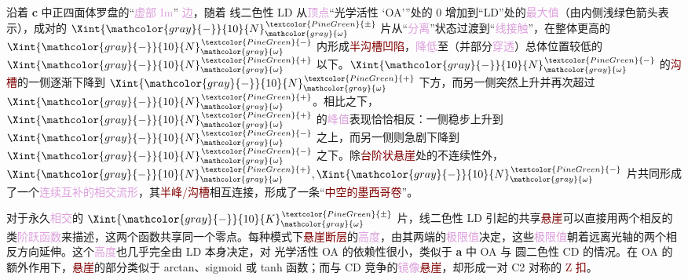 沿着 \textbf{c} 中\textcolor{NavyBlue}{正四面体罗盘}的“\textcolor{Plum}{虚部 Im}” \textcolor{Plum}{边}，随着 \textcolor{NavyBlue}{线二色性 LD} 从\textcolor{Plum}{顶点}“\textcolor{NavyBlue}{光学活性 `OA'}”处的 0 增加到“\textcolor{NavyBlue}{LD}”处的\textcolor{Plum}{最大值}（由内侧浅绿色箭头表示），成对的 $\Xint{\mathcolor{gray}{-}}{10}{N}^{\;\!\textcolor{PineGreen}{\pm}}_{\mathcolor{gray}{\omega}}$ 片从“\textcolor{Plum}{分离}”状态过渡到“\textcolor{Plum}{线接触}”，在整体更高的 $\Xint{\mathcolor{gray}{-}}{10}{N}^{\;\!\textcolor{PineGreen}{-}}_{\mathcolor{gray}{\omega}}$ 内形成\textcolor{Maroon}{半沟槽凹陷}，\textcolor{Plum}{降低}至（并部分\textcolor{Plum}{穿透}）总体位置较低的 $\Xint{\mathcolor{gray}{-}}{10}{N}^{\;\!\textcolor{PineGreen}{+}}_{\mathcolor{gray}{\omega}}$ 以下。$\Xint{\mathcolor{gray}{-}}{10}{N}^{\;\!\textcolor{PineGreen}{-}}_{\mathcolor{gray}{\omega}}$ 的\textcolor{Maroon}{沟槽}的一侧逐渐下降到 $\Xint{\mathcolor{gray}{-}}{10}{N}^{\;\!\textcolor{PineGreen}{+}}_{\mathcolor{gray}{\omega}}$ 下方，而另一侧突然上升并再次超过 $\Xint{\mathcolor{gray}{-}}{10}{N}^{\;\!\textcolor{PineGreen}{+}}_{\mathcolor{gray}{\omega}}$。相比之下，$\Xint{\mathcolor{gray}{-}}{10}{N}^{\;\!\textcolor{PineGreen}{+}}_{\mathcolor{gray}{\omega}}$ 的\textcolor{Plum}{峰值}表现恰恰相反：一侧稳步上升到 $\Xint{\mathcolor{gray}{-}}{10}{N}^{\;\!\textcolor{PineGreen}{-}}_{\mathcolor{gray}{\omega}}$ 之上，而另一侧则急剧下降到 $\Xint{\mathcolor{gray}{-}}{10}{N}^{\;\!\textcolor{PineGreen}{-}}_{\mathcolor{gray}{\omega}}$ 之下。除\textcolor{Maroon}{台阶状悬崖}处的不连续性外，$\Xint{\mathcolor{gray}{-}}{10}{N}^{\;\!\textcolor{PineGreen}{+}}_{\mathcolor{gray}{\omega}}, \Xint{\mathcolor{gray}{-}}{10}{N}^{\;\!\textcolor{PineGreen}{-}}_{\mathcolor{gray}{\omega}}$ 片共同形成了一个\textcolor{Plum}{连续互补的相交流形}，其\textcolor{Maroon}{半峰/沟槽}相互连接，形成了一条“\textcolor{Maroon}{中空的墨西哥卷}”。

对于永久\textcolor{Plum}{相交}的 $\Xint{\mathcolor{gray}{-}}{10}{K}^{\;\!\textcolor{PineGreen}{\pm}}_{\mathcolor{gray}{\omega}}$ 片，\textcolor{NavyBlue}{线二色性 LD} 引起的共享\textcolor{Maroon}{悬崖}可以直接用两个相反的类\textcolor{Plum}{阶跃函数}来描述，这两个函数共享同一个零点。每种\textcolor{PineGreen}{模式}下\textcolor{Maroon}{悬崖断层}的\textcolor{Plum}{高度}，由其两端的\textcolor{Plum}{极限值}决定，这些\textcolor{Plum}{极限值}朝着远离\textcolor{PineGreen}{光轴}的两个相反方向延伸。这个\textcolor{Plum}{高度}也几乎完全由 \textcolor{NavyBlue}{LD} 本身决定，对 \textcolor{NavyBlue}{光学活性 OA} 的依赖性很小，类似于 \textbf{a} 中 \textcolor{NavyBlue}{OA} 与 \textcolor{NavyBlue}{圆二色性 CD} 的情况。在 \textcolor{NavyBlue}{OA} 的额外作用下，\textcolor{Maroon}{悬崖}的部分类似于 arctan、sigmoid 或 tanh 函数；而与 \textcolor{NavyBlue}{CD} 竞争的\textcolor{Plum}{镜像}\textcolor{Maroon}{悬崖}，却形成一对 \textcolor{NavyBlue}{C2 对称}的 \textcolor{Maroon}{Z 扣}。

